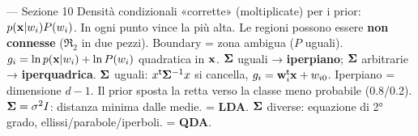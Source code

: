\begin{appunti}{— Sezione 10}
 Densità condizionali «corrette» (moltiplicate) per i prior: $p(\mathbf{x}|w_i)P(w_i)$. In ogni punto vince la più alta.
 Le regioni possono essere \textbf{non connesse} ($\Re_2$ in due pezzi). Boundary = zona ambigua ($P$ uguali). $g_i=\ln p(\mathbf{x}|w_i)+\ln P(w_i)$ quadratica in $\mathbf{x}$. $\bm{\Sigma}$ uguali → \textbf{iperpiano}; $\bm{\Sigma}$ arbitrarie → \textbf{iperquadrica}.
 $\bm{\Sigma}$ uguali: $x^{\mathsf{t}}\bm{\Sigma}^{-1}x$ si cancella, $g_i=\mathbf{w}_i^{\mathsf{t}}\mathbf{x}+w_{i0}$. Iperpiano = dimensione $d-1$. Il prior sposta la retta verso la classe meno probabile (0.8/0.2). $\bm{\Sigma}=\sigma^2I$: distanza minima dalle medie. = \textbf{LDA}.
 $\bm{\Sigma}$ diverse: equazione di 2° grado, ellissi/parabole/iperboli. = \textbf{QDA}.
\end{appunti}
